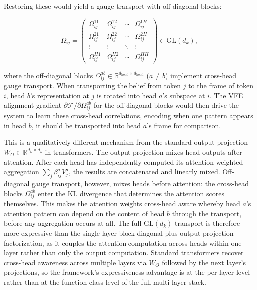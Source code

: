 \documentclass[twoside,11pt]{article}
\begin{document}
Restoring these would yield a gauge transport with off-diagonal blocks:

\begin{equation}
\Omega_{ij} = \begin{pmatrix}
\Omega_{ij}^{11} & \Omega_{ij}^{12} & \cdots & \Omega_{ij}^{1H} \\
\Omega_{ij}^{21} & \Omega_{ij}^{22} & \cdots & \Omega_{ij}^{2H} \\
\vdots & \vdots & \ddots & \vdots \\
\Omega_{ij}^{H1} & \Omega_{ij}^{H2} & \cdots & \Omega_{ij}^{HH}
\end{pmatrix} \in \mathrm{GL}(d_k),
\label{eq:full_gauge_transport}
\end{equation}

where the off-diagonal blocks $\Omega_{ij}^{ab} \in \mathbb{R}^{d_{\text{head}} \times d_{\text{head}}}$ ($a \neq b$) implement cross-head gauge transport. When transporting the belief from token $j$ to the frame of token $i$, head $b$'s representation at $j$ is rotated into head $a$'s subspace at $i$. The VFE alignment gradient $\partial \mathcal{F}/\partial \Omega_{ij}^{ab}$ for the off-diagonal blocks would then drive the system to learn these cross-head correlations, encoding when one pattern appears in head $b$, it should be transported into head $a$'s frame for comparison.

This is a qualitatively different mechanism from the standard output projection $W_O \in \mathbb{R}^{d_k \times d_k}$ in transformers. The output projection mixes head outputs after attention. After each head has independently computed its attention-weighted aggregation $\sum_j \beta_{ij}^a V_j^a$, the results are concatenated and linearly mixed. Off-diagonal gauge transport, however, mixes heads before attention: the cross-head blocks $\Omega_{ij}^{ab}$ enter the KL divergence that determines the attention scores themselves. This makes the attention weights cross-head aware whereby head $a$'s attention pattern can depend on the content of head $b$ through the transport, before any aggregation occurs at all. The full-$\mathrm{GL}(d_k)$ transport is therefore more expressive than the single-layer block-diagonal-plus-output-projection factorization, as it couples the attention computation across heads within one layer rather than only the output computation. Standard transformers recover cross-head awareness across multiple layers via $W_O$ followed by the next layer's projections, so the framework's expressiveness advantage is at the per-layer level rather than at the function-class level of the full multi-layer stack.
\end{document}
